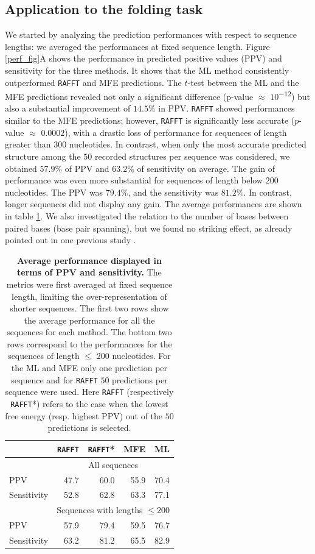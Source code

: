 \subsection{Application to the folding task}
We started by analyzing the prediction performances with respect to sequence lengths: we averaged the performances at fixed sequence length. Figure \ref{perf_fig}A shows the performance in predicted positive values (PPV) and sensitivity for the three methods. It shows that the ML method consistently outperformed \texttt{RAFFT} and MFE predictions. The $t$-test between the ML and the MFE predictions revealed not only a significant difference (p-value \(\approx\) $10$\textsuperscript{$-12$}) but also a substantial improvement of $14.5\%$ in PPV. \texttt{RAFFT} showed performances similar to the MFE predictions; however, \texttt{RAFFT} is significantly less accurate ($p$-value \(\approx\) $0.0002$), with a drastic loss of performance for sequences of length greater than $300$ nucleotides. In contrast, when only the most accurate predicted structure among the $50$ recorded structures per sequence was considered, we obtained $57.9\%$ of PPV and $63.2\%$ of sensitivity on average. The gain of performance was even more substantial for sequences of length below $200$ nucleotides. The PPV was $79.4\%$, and the sensitivity was $81.2\%$. In contrast, longer sequences did not display any gain. The average performances are shown in table \ref{average_perf}. We also investigated the relation to the number of bases between paired bases (base pair spanning), but we found no striking effect, as already pointed out in one previous study \cite{amman13_troub_long_range_base_pairs_rna_foldin}.
\begin{table}[htbp]
	\caption{\label{average_perf}\textbf{Average performance displayed in terms of PPV and sensitivity.} The metrics were first averaged at fixed sequence length, limiting the over-representation of shorter sequences. The first two rows show the average performance for all the sequences for each method. The bottom two rows correspond to the performances for the sequences of length \(\leq\) $200$ nucleotides. For the ML and MFE only one prediction per sequence and for \texttt{RAFFT} $50$ predictions per sequence were used. Here \texttt{RAFFT} (respectively \texttt{RAFFT}*) refers to the case when the lowest free energy (resp. highest PPV) out of the $50$ predictions is selected.}
	\centering
	\begin{tabular}{lrrrr}
		\hline
		& \texttt{RAFFT} & \texttt{RAFFT}* & MFE  & ML\\
		\hline
		& \multicolumn{4}{c}{All sequences}\\
		\cmidrule{2-5}
		PPV         & 47.7  & 60.0   & 55.9 & 70.4\\
		Sensitivity & 52.8  & 62.8   & 63.3 & 77.1\\
		\hline
		& \multicolumn{4}{c}{Sequences with lengths \(\leq 200\)}\\
		\cmidrule{2-5}
		PPV         & 57.9  & 79.4   & 59.5 & 76.7\\
		Sensitivity & 63.2  & 81.2   & 65.5 & 82.9\\
		\hline
	\end{tabular}
\end{table}

